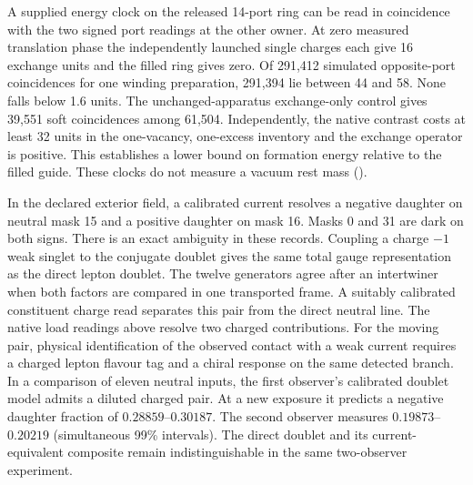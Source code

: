 A supplied energy clock on the released 14-port ring can be read
in coincidence with the two signed port readings at the other owner.
At zero measured translation phase the independently launched single
charges each give 16 exchange units and the filled ring gives zero.
Of 291,412 simulated opposite-port coincidences for one winding
preparation, 291,394 lie between 44 and 58. None falls below 1.6
units. The unchanged-apparatus exchange-only control gives 39,551
soft coincidences among 61,504. Independently, the native contrast
costs at least 32 units in the one-vacancy, one-excess inventory
and the exchange operator is positive. This establishes a lower bound
on formation energy relative to the filled guide. These clocks do
not measure a vacuum rest mass ().

In the declared exterior field, a calibrated current resolves a negative
daughter on neutral mask 15 and a positive daughter on mask 16. Masks
0 and 31 are dark on both signs. There is an exact ambiguity in these
records. Coupling a charge $-1$ weak singlet to the conjugate doublet
gives the same total gauge representation as the direct lepton doublet.
The twelve generators agree after an intertwiner when both factors are
compared in one transported frame. A suitably calibrated constituent
charge read separates this pair from the direct neutral line. The
native load readings above resolve two charged contributions.
For the moving pair, physical identification of the observed contact
with a weak current requires a charged lepton flavour tag and a
chiral response on the same detected branch. In a comparison of eleven
neutral inputs, the first observer's calibrated doublet model admits a
diluted charged pair. At a new exposure it predicts a negative daughter
fraction of $0.28859$--$0.30187$. The second observer measures
$0.19873$--$0.20219$ (simultaneous 99\% intervals). The direct
doublet and its current-equivalent composite remain indistinguishable
in the same two-observer experiment.


